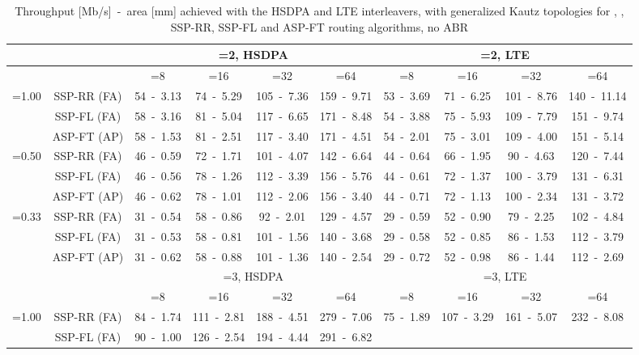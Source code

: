 \documentclass[10pt,twocolumn,journal]{IEEEtran}
\begin{document}
\begin{table*}[t!]
  \centering
  \caption{Throughput [Mb/s]~-~area [mm] achieved with the HSDPA  and LTE  interleavers, 
with generalized Kautz topologies for , , SSP-RR, SSP-FL and ASP-FT routing algorithms, no ABR} 
  \label{tab:hsdpa_lte}
   { \scriptsize
  \begin{tabular}{|c|c|c|c|c|c|c|c|c|c|}
\hline
& 	 & \multicolumn{4}{c|}{=2, HSDPA} & \multicolumn{4}{c|}{=2, LTE} \\
\hline
& 	 & =8 & =16 & =32 & =64  & =8 & =16 & =32 & =64 \\
\hline
\multirow{3}{*}{=1.00} & SSP-RR (FA) & 54~-~3.13 & 74~-~5.29 & 105~-~7.36 & 159~-~9.71 
& 53~-~3.69 & 71~-~6.25 & 101~-~8.76 & 140~-~11.14 \\
& SSP-FL (FA) & 58~-~3.16 & 81~-~5.04 & 117~-~6.65 & 171~-~8.48 
& 54~-~3.88 & 75~-~5.93 & 109~-~7.79 & 151~-~9.74 \\
& ASP-FT (AP) & 58~-~1.53 & 81~-~2.51 & 117~-~3.40 & 171~-~4.51 
& 54~-~2.01 & 75~-~3.01 & 109~-~4.00 & 151~-~5.14 \\
\hline
\multirow{3}{*}{=0.50} & SSP-RR (FA) & 46~-~0.59 & 72~-~1.71 & 101~-~4.07 & 142~-~6.64 
& 44~-~0.64 & 66~-~1.95 & 90~-~4.63 & 120~-~7.44 \\
& SSP-FL (FA) & 46~-~0.56 & 78~-~1.26 & 112~-~3.39 & 156~-~5.76 
& 44~-~0.61 & 72~-~1.37 & 100~-~3.79 & 131~-~6.31 \\
& ASP-FT (AP) \cite{martina_MPMS11} & 46~-~0.62 & 78~-~1.01 & 112~-~2.06 & 156~-~3.40 
& 44~-~0.71 & 72~-~1.13 & 100~-~2.34 & 131~-~3.72 \\
\hline
\multirow{3}{*}{=0.33} & SSP-RR (FA) & 31~-~0.54 & 58~-~0.86 & 92~-~2.01 & 129~-~4.57 
& 29~-~0.59 & 52~-~0.90 & 79~-~2.25 & 102~-~4.84 \\
& SSP-FL (FA) & 31~-~0.53 & 58~-~0.81 & 101~-~1.56 & 140~-~3.68 
& 29~-~0.58 & 52~-~0.85 & 86~-~1.53 & 112~-~3.79 \\
& ASP-FT (AP) & 31~-~0.62 & 58~-~0.88 & 101~-~1.36 & 140~-~2.54 
& 29~-~0.72 & 52~-~0.98 & 86~-~1.44 & 112~-~2.69 \\
\hline
\hline
& 	 & \multicolumn{4}{c|}{=3, HSDPA} & \multicolumn{4}{c|}{=3, LTE} \\
\hline
& 	 & =8 & =16 & =32 & =64  & =8 & =16 & =32 & =64 \\
\hline
\multirow{3}{*}{=1.00} & SSP-RR (FA) & 84~-~1.74 & 111~-~2.81 & 188~-~4.51 & 279~-~7.06 
& 75~-~1.89 & 107~-~3.29 & 161~-~5.07 & 232~-~8.08 \\
& SSP-FL (FA) & 90~-~1.00 & 126~-~2.54 & 194~-~4.44 & 291~-~6.82 

\end{tabular}}
\end{table*}
\end{document}
